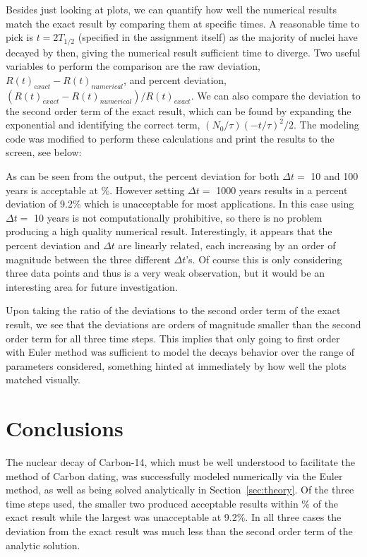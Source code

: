 \documentclass[notitlepage,aps,prd,nofootinbib]{revtex4-1}
\begin{document}
Besides just looking at plots, we can quantify how well the numerical results match the exact result by comparing them at specific times. A reasonable time to pick is $t = 2T_{1/2}$ (specified in the assignment itself) as the majority of nuclei have decayed by then, giving the numerical result sufficient time to diverge. Two useful variables to perform the comparison are the raw deviation, $R\left(t\right)_{exact}-R\left(t\right)_{numerical}$, and percent deviation, $\left(R\left(t\right)_{exact}-R\left(t\right)_{numerical}\right)/R\left(t\right)_{exact}$. We can also compare the deviation to the second order term of the exact result, which can be found by expanding the exponential and identifying the correct term, $\left(N_{0}/\tau\right) \left(-t/\tau\right)^2/2$. The modeling code was modified to perform these calculations and print the results to the screen, see below: %
\newline


As can be seen from the output, the percent deviation for both $\Delta t =$ 10 and 100 years is acceptable at \%. However setting $\Delta t =$ 1000 years results in a percent deviation of 9.2\% which is unacceptable for most applications. In this case using $\Delta t =$ 10 years is not computationally prohibitive, so there is no problem producing a high quality numerical result. Interestingly, it appears that the percent deviation and $\Delta t$ are linearly related, each increasing by an order of magnitude between the three different $\Delta t$'s. Of course this is only considering three data points and thus is a very weak observation, but it would be an interesting area for future investigation.

Upon taking the ratio of the deviations to the second order term of the exact result, we see that the deviations are orders of magnitude smaller than the second order term for all three time steps. This implies that only going to first order with Euler method was sufficient to model the decays behavior over the range of parameters considered, something hinted at immediately by how well the plots matched visually.

\section{Conclusions}
\label{sec:Conclusions}
The nuclear decay of Carbon-14, which must be well understood to facilitate the method of Carbon dating, was successfully modeled numerically via the Euler method, as well as being solved analytically in Section~\ref{sec:theory}. Of the three time steps used, the smaller two produced acceptable results within \% of the exact result while the largest was unacceptable at 9.2\%. In all three cases the deviation from the exact result was much less than the second order term of the analytic solution.
\end{document}
